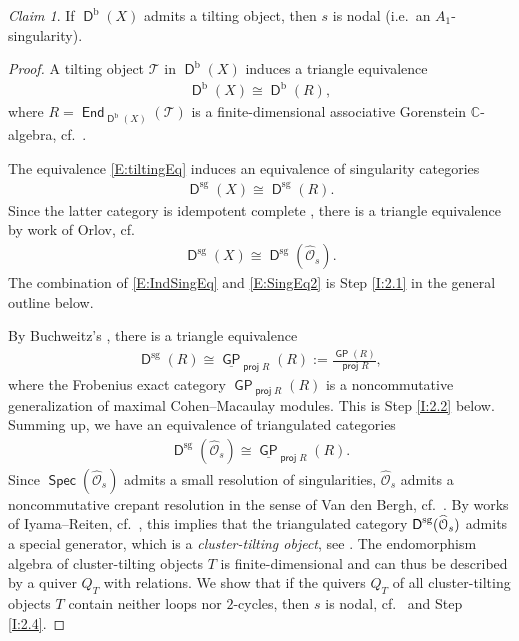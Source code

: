 \documentclass[reqno, 12pt, a4paper, twosided, english]{amsart}
\theoremstyle{plain}
\theoremstyle{definition}
\theoremstyle{remark}
\newtheorem{Claim}[thm]{Claim} %
\newtheorem*{Key Statement}{Key Statement}
\newcommand{\ul}[1]{\underline{#1}}
\newcommand{\GP}{\opname{GP}}
\DeclareMathOperator{\End}{\mathsf{End}}
\DeclareMathOperator{\Spec}{\mathsf{Spec}}
\newcommand{\opname}[1]{\operatorname{\mathsf{#1}}}
\newcommand{\proj}{\opname{proj}\nolimits}
\newcommand{\ct}{{\mathcal T}}
\newcommand{\C}{\mathbb{C}}
\newcommand{\Dsg}{\opname{D}^{\mathrm{sg}}}
\newcommand{\Db}{\opname{D}^{\mathrm{b}}}
\begin{document}
\begin{Claim}\label{clm:special}
 If $\Db(X)$ admits a tilting object, then $s$ is nodal (i.e.\ an $A_1$-singularity).   
\end{Claim} 
\begin{proof}
A tilting object $\ct$ in 
$\Db(X)$ induces a triangle equivalence
\begin{align}\label{E:tiltingEq}
    \Db(X) \cong \Db(R),
\end{align}
where $R=\End_{\Db(X)}(\ct)$ is a finite-dimensional associative Gorenstein $\C$-algebra, cf.\ .

The equivalence \eqref{E:tiltingEq} induces an equivalence of singularity categories
\begin{align}\label{E:IndSingEq}
    \Dsg(X) \cong \Dsg(R).
\end{align}
Since the latter category is idempotent complete \cite[Corollary 2.4]{XWChen}, there is a triangle equivalence by work of Orlov, cf.\ 
\begin{align}\label{E:SingEq2}
    \Dsg(X) \cong \Dsg(\widehat{\mathcal{O}}_s).
\end{align}
The combination of \eqref{E:IndSingEq} and \eqref{E:SingEq2} is Step \ref{I:2.1} in the general outline below.

By Buchweitz's , there is a triangle equivalence
\begin{align*}
     \Dsg(R) \cong \ul{\GP}_{\proj R}(R):= \frac{\GP(R)}{\proj R},
\end{align*}
where the Frobenius exact category $\GP_{\proj R}(R)$ is a noncommutative generalization of maximal Cohen--Macaulay modules. 
This is Step \ref{I:2.2} below. Summing up, we have an equivalence of triangulated categories
\begin{align}\label{E:Summary}
     \Dsg(\widehat{\mathcal{O}}_s) \cong \ul{\GP}_{\proj R}(R).
\end{align}
Since $\Spec(\widehat{\mathcal{O}}_s)$ admits a small resolution of singularities, $\widehat{\mathcal{O}}_s$ admits a noncommutative crepant resolution in the sense of Van den Bergh, cf.\ . 
By works of Iyama--Reiten, cf.\ , this implies that the triangulated category $\Dsg(\smash{\widehat{\mathcal{O}}_s})$ admits a special generator, which is a \emph{cluster-tilting object}, see . 
The endomorphism algebra of cluster-tilting objects $T$ is finite-dimensional and can thus be described by a quiver $Q_T$ with relations. 
We show that if the quivers $Q_T$ of all cluster-tilting objects $T$ contain neither loops nor $2$-cycles, then $s$ is nodal, cf.\  and Step \ref{I:2.4}.


\end{proof}
\end{document}
